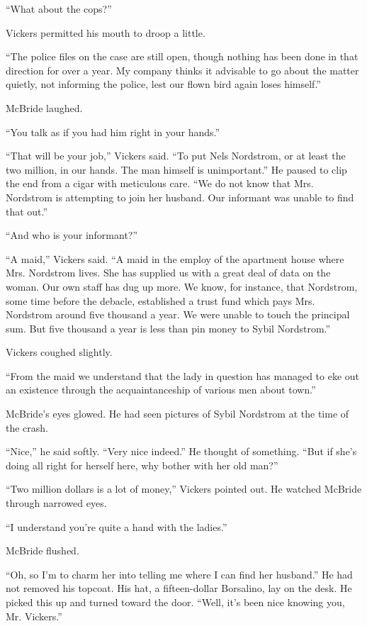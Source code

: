 \documentclass{novel}
\begin{document}
“What about the cops?”

Vickers permitted his mouth to droop a little.

“The police files on the case are still open, though nothing has been done in that direction for over a year. My company thinks it advisable to go about the matter quietly, not informing the police, lest our flown bird again loses himself.”

McBride laughed.

“You talk as if you had him right in your hands.”

“That will be your job,” Vickers said. “To put Nels Nordstrom, or at least the two million, in our hands. The man himself is unimportant.” He paused to clip the end from a cigar with meticulous care. “We do not know that Mrs. Nordstrom is attempting to join her husband. Our informant was unable to find that out.”

“And who is your informant?”

“A maid,” Vickers said. “A maid in the employ of the apartment house where Mrs. Nordstrom lives. She has supplied us with a great deal of data on the woman. Our own staff has dug up more. We know, for instance, that Nordstrom, some time before the debacle, established a trust fund which pays Mrs. Nordstrom around five thousand a year. We were unable to touch the principal sum. But five thousand a year is less than pin money to Sybil Nordstrom.”

Vickers coughed slightly.

“From the maid we understand that the lady in question has managed to eke out an existence through the acquaintanceship of various men about town.”

McBride’s eyes glowed. He had seen pictures of Sybil Nordstrom at the time of the crash.

“Nice,” he said softly. “Very nice indeed.” He thought of something. “But if she’s doing all right for herself here, why bother with her old man?”

“Two million dollars is a lot of money,” Vickers pointed out. He watched McBride through narrowed eyes.

“I understand you’re quite a hand with the ladies.”

McBride flushed.

“Oh, so I’m to charm her into telling me where I can find her husband.” He had not removed his topcoat. His hat, a fifteen-dollar Borsalino, lay on the desk. He picked this up and turned toward the door. “Well, it’s been nice knowing you, Mr. Vickers.”
\end{document}
